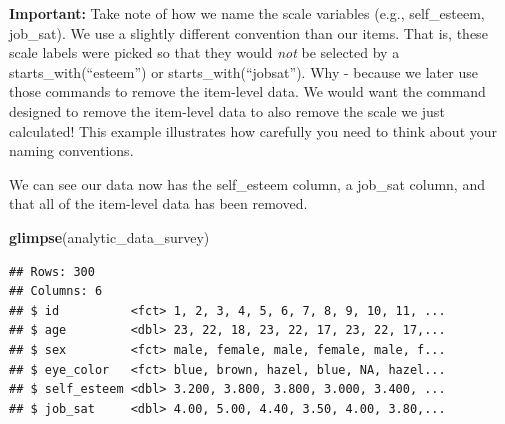 \documentclass[
]{krantz}
\makeatletter
\newenvironment{Shaded}{\begin{snugshade}}{\end{snugshade}}
\newcommand{\DataTypeTok}[1]{\textcolor[rgb]{0.27,0.27,0.27}{#1}}
\newcommand{\KeywordTok}[1]{\textcolor[rgb]{0.27,0.27,0.27}{\textbf{#1}}}
\newcommand{\NormalTok}[1]{#1}
\newcommand{\OperatorTok}[1]{\textcolor[rgb]{0.43,0.43,0.43}{\textbf{#1}}}
\newcommand{\OtherTok}[1]{\textcolor[rgb]{0.37,0.37,0.37}{#1}}
\newcommand{\StringTok}[1]{\textcolor[rgb]{0.5,0.5,0.5}{#1}}
\newenvironment{kframe}{%
\medskip{}
\setlength{\fboxsep}{.8em}
 \def\at@end@of@kframe{}%
 \ifinner\ifhmode%
  \def\at@end@of@kframe{\end{minipage}}%
  \begin{minipage}{\columnwidth}%
 \fi\fi%
 \def\FrameCommand##1{\hskip\@totalleftmargin \hskip-\fboxsep
 \colorbox{shadecolor}{##1}\hskip-\fboxsep
     \hskip-\linewidth \hskip-\@totalleftmargin \hskip\columnwidth}%
 \MakeFramed {\advance\hsize-\width
   \@totalleftmargin\z@ \linewidth\hsize
   \@setminipage}}%
 {\par\unskip\endMakeFramed%
 \at@end@of@kframe}
\renewenvironment{Shaded}{\begin{kframe}}{\end{kframe}}
\makeatother
\begin{document}
\textbf{Important:} Take note of how we name the scale variables (e.g., self\_esteem, job\_sat). We use a slightly different convention than our items. That is, these scale labels were picked so that they would \emph{not} be selected by a starts\_with(``esteem'') or starts\_with(``jobsat''). Why - because we later use those commands to remove the item-level data. We would want the command designed to remove the item-level data to also remove the scale we just calculated! This example illustrates how carefully you need to think about your naming conventions.

\begin{Shaded}
\end{Shaded}

We can see our data now has the self\_esteem column, a job\_sat column, and that all of the item-level data has been removed.

\begin{Shaded}
\begin{Highlighting}[]
\KeywordTok{glimpse}\NormalTok{(analytic_data_survey)}
\end{Highlighting}
\end{Shaded}

\begin{verbatim}
## Rows: 300
## Columns: 6
## $ id          <fct> 1, 2, 3, 4, 5, 6, 7, 8, 9, 10, 11, ...
## $ age         <dbl> 23, 22, 18, 23, 22, 17, 23, 22, 17,...
## $ sex         <fct> male, female, male, female, male, f...
## $ eye_color   <fct> blue, brown, hazel, blue, NA, hazel...
## $ self_esteem <dbl> 3.200, 3.800, 3.800, 3.000, 3.400, ...
## $ job_sat     <dbl> 4.00, 5.00, 4.40, 3.50, 4.00, 3.80,...
\end{verbatim}
\end{document}
